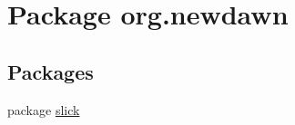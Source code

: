 \hypertarget{namespaceorg_1_1newdawn}{}\section{Package org.\+newdawn}
\label{namespaceorg_1_1newdawn}
\subsection*{Packages}
\begin{DoxyCompactItemize}
\item 
package \mbox{\hyperlink{namespaceorg_1_1newdawn_1_1slick}{slick}}
\end{DoxyCompactItemize}
